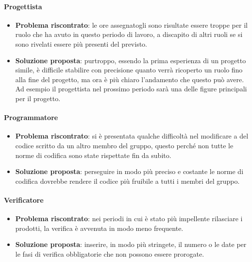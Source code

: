         \paragraph{Progettista}
            \begin{itemize}
                \item \textbf{Problema riscontrato}: le ore assegnatogli sono risultate essere troppe per il ruolo che ha avuto in questo periodo di lavoro, a discapito di altri ruoli se si sono rivelati essere più presenti del previsto.
                \item \textbf{Soluzione proposta}: purtroppo, essendo la prima esperienza di un progetto simile, è difficile stabilire con precisione quanto verrà ricoperto un ruolo fino alla fine del progetto, ma ora è più chiaro l'andamento che questo può avere. Ad esempio il progettista nel prossimo periodo sarà una delle figure principali per il progetto.
            \end{itemize}
        
        \paragraph{Programmatore}
            \begin{itemize}
                \item \textbf{Problema riscontrato}: si è presentata qualche difficoltà nel modificare a del codice scritto da un altro membro del gruppo, questo perché non tutte le norme di codifica sono state rispettate fin da subito.
                \item \textbf{Soluzione proposta}: perseguire in modo più preciso e costante le norme di codifica dovrebbe rendere il codice più fruibile a tutti i membri del gruppo.
            \end{itemize}
        
        \paragraph{Verificatore}
            \begin{itemize}
                \item \textbf{Problema riscontrato}: nei periodi in cui è stato più impellente rilasciare i prodotti, la verifica è avvenuta in modo meno frequente.
                \item \textbf{Soluzione proposta}: inserire, in modo più stringete, il numero o le date per le fasi di verifica obbligatorie che non possono essere prorogate.
            \end{itemize}
    
